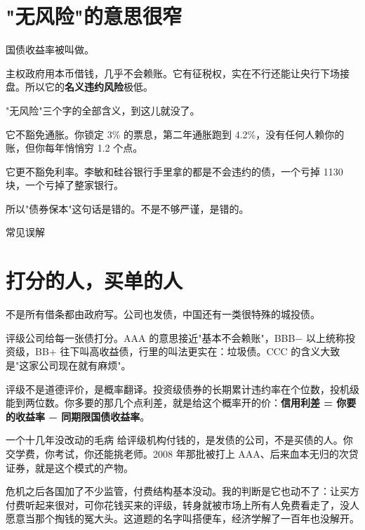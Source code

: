 \section{"无风险"的意思很窄}

国债收益率被叫做。

主权政府用本币借钱，几乎不会赖账。它有征税权，实在不行还能让央行下场接盘。所以它的\textbf{名义违约风险}极低。

"无风险"三个字的全部含义，到这儿就没了。

它不豁免通胀。你锁定 3\% 的票息，第二年通胀跑到 4.2\%，没有任何人赖你的账，但你每年悄悄穷 1.2 个点。

它更不豁免利率。李敏和硅谷银行手里拿的都是不会违约的债，一个亏掉 1130 块，一个亏掉了整家银行。

所以"债券保本"这句话是错的。不是不够严谨，是错的。

\begin{mythbox}{常见误解}
\end{mythbox}

\section{打分的人，买单的人}

不是所有借条都由政府写。公司也发债，中国还有一类很特殊的城投债。

评级公司给每一张债打分。AAA 的意思接近"基本不会赖账"，BBB− 以上统称投资级，BB+ 往下叫高收益债，行里的叫法更实在：垃圾债。CCC 的含义大致是"这家公司现在就有麻烦"。

评级不是道德评价，是概率翻译。投资级债券的长期累计违约率在个位数，投机级能到两位数。你多要的那几个点利差，就是给这个概率开的价：\textbf{信用利差 = 你要的收益率 − 同期限国债收益率}。

\begin{databox}{一个十几年没改动的毛病}
给评级机构付钱的，是发债的公司，不是买债的人。你交学费，你考试，你还能挑老师。2008 年那批被打上 AAA、后来血本无归的次贷证券，就是这个模式的产物。

危机之后各国加了不少监管，付费结构基本没动。我的判断是它也动不了：让买方付费听起来很对，可你花钱买来的评级，转身就被市场上所有人免费看走了，没人愿意当那个掏钱的冤大头。这道题的名字叫搭便车，经济学解了一百年也没解开。

\end{databox}

